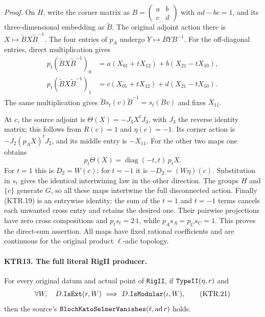 \documentclass[11pt,a4paper]{article}
\numberwithin{equation}{section}
\theoremstyle{remark}\newtheorem{remark}[theorem]{Remark}
\begin{document}
\emph{Proof.}
On \(H\), write the corner matrix as
\(B=\left(\begin{smallmatrix}a&b\\c&d\end{smallmatrix}\right)\)
with \(ad-bc=1\), and its three-dimensional embedding as
\(\widetilde B\).  The original adjoint action there is
\(X\mapsto\widetilde B X\widetilde B^{-1}\).
The four entries of \(p_A\) undergo \(Y\mapsto BYB^{-1}\).
For the off-diagonal entries, direct multiplication gives
\[
 \begin{split}
 p_t(\widetilde B X\widetilde B^{-1})_0
       &=a(X_{01}+tX_{12})+b(X_{21}-tX_{10}),\\
 p_t(\widetilde B X\widetilde B^{-1})_1
       &=c(X_{01}+tX_{12})+d(X_{21}-tX_{10}).
 \end{split}
\]
The same multiplication gives
\(\widetilde B s_t(v)\widetilde B^{-1}=s_t(Bv)\)
and fixes \(X_{11}\).

At \(c\), the source adjoint is
\(\Theta(X)=-J_3X^tJ_3\), with \(J_3\) the reverse
identity matrix; this follows from \(R(c)=1\) and
\(\eta(c)=-1\).  Its corner action is
\(-J_2(p_AX)^tJ_2\), and its middle entry is \(-X_{11}\).
For the other two maps one obtains
\[
       p_t\Theta(X)=\operatorname{diag}(-t,t)\,p_tX.
 \tag{KTR.20}
\]
For \(t=1\) this is \(D_2=W(c)\); for \(t=-1\) it
is \(-D_2=(W\eta)(c)\).  Substitution in \(s_t\)
gives the identical intertwining law in the other direction.
The groups \(H\) and \(\{c\}\) generate \(G\), so
all these maps intertwine the full disconnected action.
Finally (KTR.19) is an entrywise identity: the sum of the
\(t=1\) and \(t=-1\) terms cancels each unwanted cross
entry and retains the desired one.  Their pairwise projections
have zero cross compositions and \(p_ts_t=2\,1\), while
\(p_As_A=p_Cs_C=1\).  This proves the direct-sum assertion.
All maps have fixed rational coefficients and are continuous
for the original product \(\ell\)-adic topology.

\paragraph{KTR13. The full literal RigII producer.}
\label{claim:KTR13}
For every original datum and actual point of \texttt{Rig\allowbreak II},
if \(\texttt{Type\allowbreak II}(\eta,r)\) and
\[
 \forall W,\quad D.\texttt{Is\allowbreak Ext}(r,W)
                 \ \Longrightarrow\ D.\texttt{Is\allowbreak Modular}(\iota,W),
 \tag{KTR.21}
\]
then the source's
\(\texttt{Bloch\allowbreak Kato\allowbreak Selmer\allowbreak Vanishes}(\ell,\operatorname{ad}r)\)
holds.
\end{document}
